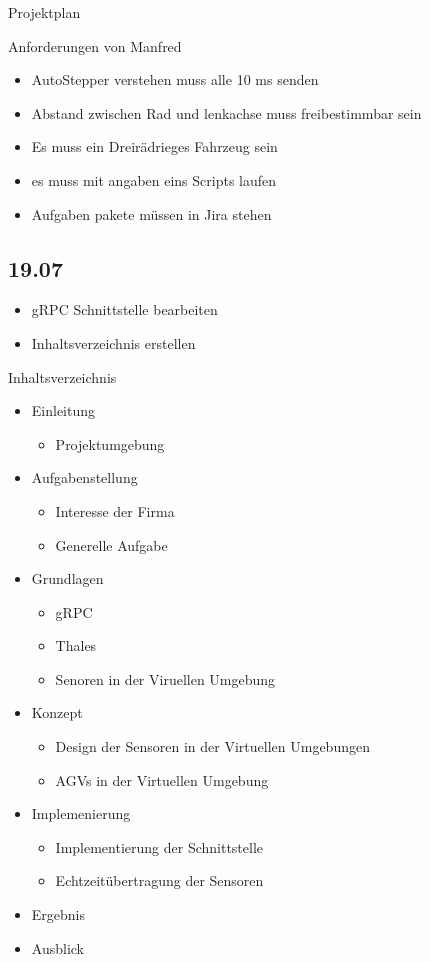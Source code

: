Projektplan



Anforderungen von Manfred
\begin{itemize}
\item AutoStepper verstehen muss alle 10 ms senden
\item Abstand zwischen Rad und lenkachse muss freibestimmbar sein
\item Es muss ein Dreirädrieges Fahrzeug sein
\item es muss mit angaben eins Scripts laufen 
\item Aufgaben pakete müssen in Jira stehen
\end{itemize}

\subsection{19.07}
\begin{itemize}
\item gRPC Schnittstelle bearbeiten
\item Inhaltsverzeichnis erstellen
\end{itemize}

Inhaltsverzeichnis
\begin{itemize}
\item Einleitung
\begin{itemize}
\item Projektumgebung
\end{itemize}
\item Aufgabenstellung
\begin{itemize}
\item Interesse der Firma
\item Generelle Aufgabe
\end{itemize}
\item Grundlagen
\begin{itemize}
\item gRPC 
\item Thales
\item Senoren in der Viruellen Umgebung
\end{itemize}
\item Konzept
\begin{itemize}
\item Design der Sensoren in der Virtuellen Umgebungen 
\item AGVs in der Virtuellen Umgebung
\end{itemize}
\item Implemenierung
\begin{itemize}
\item Implementierung der Schnittstelle
\item Echtzeitübertragung der Sensoren
\end{itemize}
\item Ergebnis
\item Ausblick
\end{itemize}

